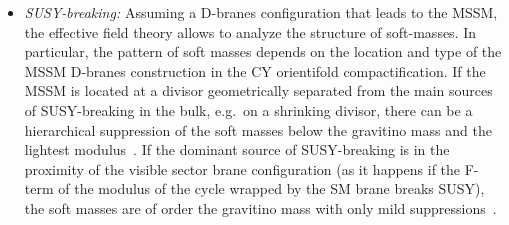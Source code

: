 \documentclass[12pt,a4paper]{book}
\begin{document}
\begin{itemize}
\item {\it SUSY-breaking:} Assuming a D-branes configuration that leads to the MSSM, the effective field theory allows to analyze the structure of soft-masses. In particular, the pattern of soft masses depends on the location and type of the MSSM D-branes construction in the CY orientifold compactification. If the MSSM is located at a divisor geometrically separated from the main sources of SUSY-breaking in the bulk, e.g.~on a shrinking divisor, there can be a hierarchical suppression of the soft masses below the gravitino mass and the lightest modulus~\cite{Blumenhagen:2009gk}. If the dominant source of SUSY-breaking is in the proximity of the visible sector brane configuration (as it happens if the F-term of the modulus of the cycle wrapped by the SM brane breaks SUSY), the soft masses are of order the gravitino mass with only mild suppressions~\cite{Conlon:2005ki, Conlon:2010ji,Choi:2010gm,Shin:2011uk}.
\end{itemize}
\end{document}
